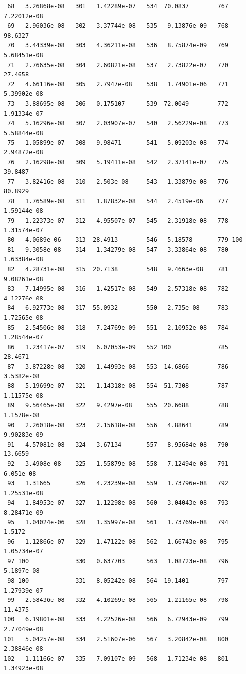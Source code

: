 \documentclass{article}
\begin{document}
\begin{verbatim}
 68   3.26868e-08   301   1.42289e-07   534  70.0837        767   7.22012e-08
 69   2.96036e-08   302   3.37744e-08   535   9.13876e-09   768  98.6327
 70   3.44339e-08   303   4.36211e-08   536   8.75874e-09   769   5.68451e-08
 71   2.76635e-08   304   2.60821e-08   537   2.73822e-07   770  27.4658
 72   4.66116e-08   305   2.7947e-08    538   1.74901e-06   771   5.39902e-08
 73   3.88695e-08   306   0.175107      539  72.0049        772   1.91334e-07
 74   5.16296e-08   307   2.03907e-07   540   2.56229e-08   773   5.58844e-08
 75   1.05899e-07   308   9.98471       541   5.09203e-08   774   2.94872e-08
 76   2.16298e-08   309   5.19411e-08   542   2.37141e-07   775  39.8487
 77   3.82416e-08   310   2.503e-08     543   1.33879e-08   776  80.8929
 78   1.76589e-08   311   1.87832e-08   544   2.4519e-06    777   1.59144e-08
 79   1.22373e-07   312   4.95507e-07   545   2.31918e-08   778   1.31574e-07
 80   4.0689e-06    313  28.4913        546   5.18578       779 100
 81   9.3058e-08    314   1.34279e-08   547   3.33864e-08   780   1.63384e-08
 82   4.28731e-08   315  20.7138        548   9.4663e-08    781   9.08261e-08
 83   7.14995e-08   316   1.42517e-08   549   2.57318e-08   782   4.12276e-08
 84   6.92773e-08   317  55.0932        550   2.735e-08     783   1.72565e-08
 85   2.54506e-08   318   7.24769e-09   551   2.10952e-08   784   1.28544e-07
 86   1.23417e-07   319   6.07053e-09   552 100             785  28.4671
 87   3.87228e-08   320   1.44993e-08   553  14.6866        786   3.5382e-08
 88   5.19699e-07   321   1.14318e-08   554  51.7308        787   1.11575e-08
 89   9.56465e-08   322   9.4297e-08    555  20.6688        788   1.1578e-08
 90   2.26018e-08   323   2.15618e-08   556   4.88641       789   9.90283e-09
 91   4.57081e-08   324   3.67134       557   8.95684e-08   790  13.6659
 92   3.4908e-08    325   1.55879e-08   558   7.12494e-08   791   6.051e-08
 93   1.31665       326   4.23239e-08   559   1.73796e-08   792   1.25531e-08
 94   1.84953e-07   327   1.12298e-08   560   3.04043e-08   793   8.28471e-09
 95   1.04024e-06   328   1.35997e-08   561   1.73769e-08   794   1.5172
 96   1.12866e-07   329   1.47122e-08   562   1.66743e-08   795   1.05734e-07
 97 100             330   0.637703      563   1.08723e-08   796   5.1897e-08
 98 100             331   8.05242e-08   564  19.1401        797   1.27939e-07
 99   2.58436e-08   332   4.10269e-08   565   1.21165e-08   798  11.4375
100   6.19801e-08   333   4.22526e-08   566   6.72943e-09   799   2.77049e-08
101   5.04257e-08   334   2.51607e-06   567   3.20842e-08   800   2.38846e-08
102   1.11166e-07   335   7.09107e-09   568   1.71234e-08   801   1.34923e-08

\end{verbatim}
\end{document}
